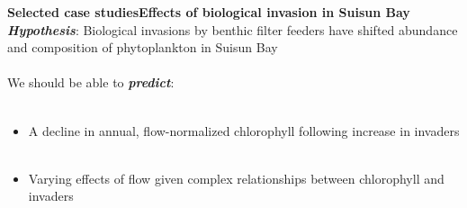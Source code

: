\documentclass[serif]{beamer}\usepackage[]{graphicx}\usepackage[]{color}
\newcommand{\emtxt}[1]{\textbf{\textit{#1}}}
\begin{document}
\begin{frame}{\textbf{Selected case studies}}{\textbf{Effects of biological invasion in Suisun Bay}}
\emtxt{Hypothesis}: Biological invasions by benthic filter feeders have shifted abundance and composition of phytoplankton in Suisun Bay \\~\\
We should be able to \emtxt{predict}: \\~\\
\begin{itemize}
\item A decline in annual, flow-normalized chlorophyll following increase in invaders\\~\\
\item Varying effects of flow given complex relationships between chlorophyll and invaders
\end{itemize}
\end{frame}
\end{document}
